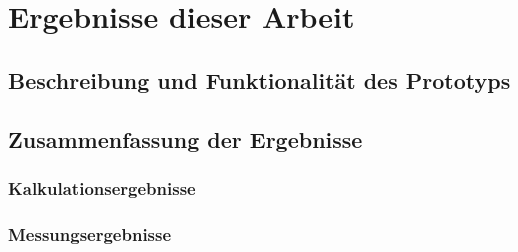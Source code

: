 \chapter{Ergebnisse dieser Arbeit}

\section{Beschreibung und Funktionalität des Prototyps}

\section{Zusammenfassung der Ergebnisse}

\subsection{Kalkulationsergebnisse}

\subsection{Messungsergebnisse}